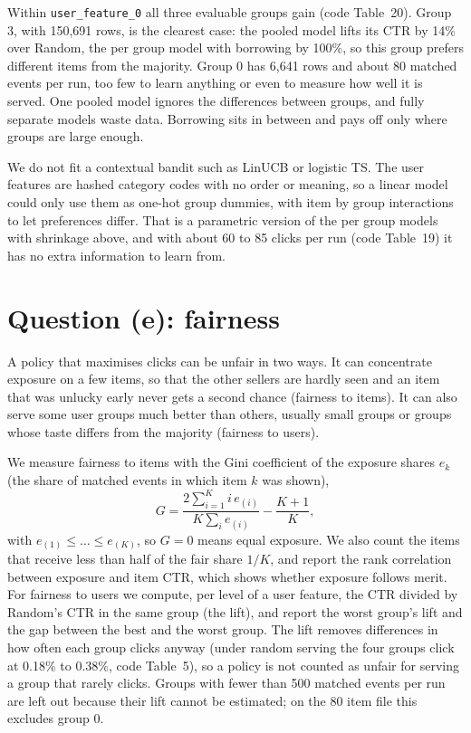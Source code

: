 \documentclass[11pt]{article}
\begin{document}
Within \texttt{user\_feature\_0} all three evaluable groups gain (code
Table~20). Group 3, with 150{,}691 rows, is the clearest case: the
pooled model lifts its CTR by 14\% over Random, the per group model with
borrowing by 100\%, so this group prefers different items from the majority.
Group 0 has 6{,}641 rows and about 80 matched events per run, too few to
learn anything or even to measure how well it is served. One pooled model
ignores the differences between groups, and fully separate models waste data.
Borrowing sits in between and pays off only where groups are large enough.

We do not fit a contextual bandit such as LinUCB or logistic TS. The user
features are hashed category codes with no order or meaning, so a linear
model could only use them as one-hot group dummies, with item by group
interactions to let preferences differ. That is a parametric version of the
per group models with shrinkage above, and with about 60 to 85 clicks per run
(code Table~19) it has no extra information to learn from.

\section{Question (e): fairness}
\label{sec:e}

A policy that maximises clicks can be unfair in two ways. It can concentrate
exposure on a few items, so that the other sellers are hardly seen and an item
that was unlucky early never gets a second chance (fairness to items). It can
also serve some user groups much better than others, usually small groups or
groups whose taste differs from the majority (fairness to users).

We measure fairness to items with the Gini coefficient of the exposure shares
$e_k$ (the share of matched events in which item $k$ was shown),
%
\begin{equation}
  G = \frac{2\sum_{i=1}^{K} i\, e_{(i)}}{K\sum_{i} e_{(i)}} - \frac{K+1}{K},
  \label{eq:gini}
\end{equation}
%
with $e_{(1)}\leq\dots\leq e_{(K)}$, so $G=0$ means equal exposure. We also
count the items that receive less than half of the fair share $1/K$, and
report the rank correlation between exposure and item CTR, which shows
whether exposure follows merit. For fairness to users we compute, per level
of a user feature, the CTR divided by Random's CTR in the same
group (the lift), and report the worst group's lift and the gap between the
best and the worst group. The lift removes differences in how often each
group clicks anyway (under random serving the four groups click at 0.18\%
to 0.38\%, code Table~5), so a policy is not counted as unfair for serving a
group that rarely clicks. Groups with fewer than 500 matched events per run
are left out because their lift cannot be estimated; on the 80 item file this
excludes group 0.
\end{document}
